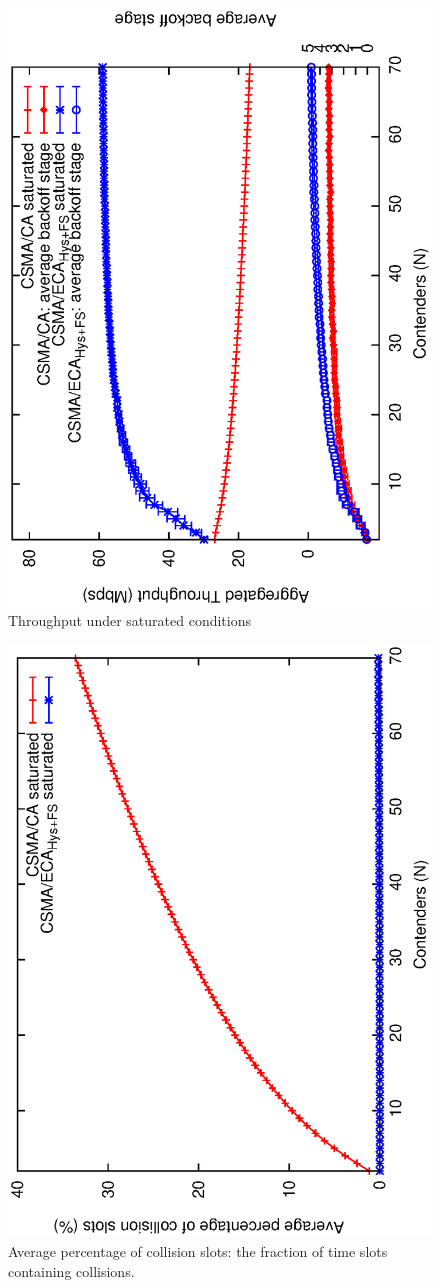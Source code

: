 	\begin{figure}[tb]
	\centering
		\includegraphics[width=0.7\linewidth,angle=-90]{figures/saturated/throughput-saturated-w-BOS/throughput-saturated-w-BOS2.eps}
		\caption{Throughput under saturated conditions}
		\label{fig:throughput-sat}
	\end{figure}
	
	\begin{figure}[tb]
	\centering
		\includegraphics[width=0.7\linewidth,angle=-90]{figures/saturated/collisions-saturated/collisions-saturated.eps}
		\caption{Average percentage of collision slots: the fraction of time slots containing collisions.}
		\label{fig:collisions-sat}
	\end{figure}
	

